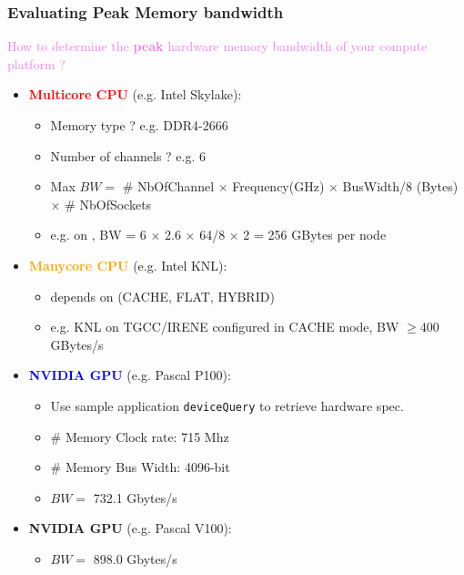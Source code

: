 \begin{frame}
  \frametitle{Evaluating Peak Memory bandwidth}

  \textcolor{violet}{\Large How to determine the {\bf peak} hardware memory bandwidth of your compute platform ?}

  \begin{itemize}
  \item \textcolor{red}{\bf Multicore CPU} (e.g. Intel Skylake):
    \begin{itemize}
    \item Memory type ? e.g. DDR4-2666
    \item Number of channels ? e.g. 6
    \item Max $BW =$ \# NbOfChannel $\times$ Frequency(GHz) $\times$ BusWidth/8 (Bytes) $\times$ \# NbOfSockets
    \item e.g. on , BW = 6 $\times$ 2.6 $\times$ 64/8 $\times$ 2 = 256 GBytes per node
    \end{itemize}
  \item \textcolor{orange}{\bf Manycore CPU} (e.g. Intel KNL):
    \begin{itemize}
    \item depends on  (CACHE, FLAT, HYBRID)
    \item e.g. KNL on TGCC/IRENE configured in CACHE mode, BW $\geqslant 400$ GBytes/s
    \end{itemize}
  \item \textcolor{blue}{\bf NVIDIA GPU} (e.g. Pascal P100):
    \begin{itemize}
    \item Use sample application {\tt deviceQuery} to retrieve hardware spec.
    \item \# Memory Clock rate:  715 Mhz
    \item \# Memory Bus Width:   4096-bit
    \item $BW =$ 732.1 Gbytes/s
    \end{itemize}
  \item \textcolor{RoyalPurple}{\bf NVIDIA GPU} (e.g. Pascal V100):
    \begin{itemize}
    \item $BW =$ 898.0 Gbytes/s
    \end{itemize}
  \end{itemize}


\end{frame}

